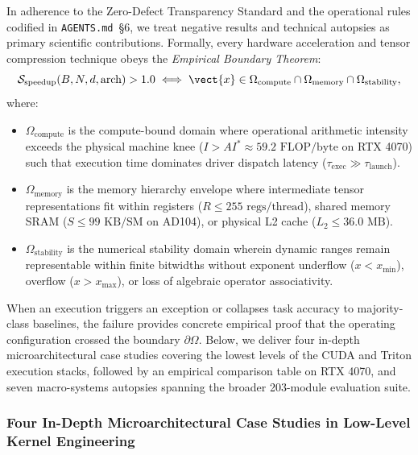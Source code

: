 In adherence to the \neuralops{} Zero-Defect Transparency Standard and the operational rules codified in \texttt{AGENTS.md}~\S6, we treat negative results and technical autopsies as primary scientific contributions. Formally, every hardware acceleration and tensor compression technique obeys the \emph{Empirical Boundary Theorem}:
\begin{equation}
    \mathcal{S}_{\text{speedup}}(B, N, d, \text{arch}) > 1.0 \iff \vect{x} \in \Omega_{\text{compute}} \cap \Omega_{\text{memory}} \cap \Omega_{\text{stability}},
    \label{eq:empirical_boundary_theorem}
\end{equation}
where:
\begin{itemize}
    \item $\Omega_{\text{compute}}$ is the compute-bound domain where operational arithmetic intensity exceeds the physical machine knee ($I > AI^* \approx 59.2\text{ FLOP/byte}$ on RTX 4070) such that execution time dominates driver dispatch latency ($\tau_{\text{exec}} \gg \tau_{\text{launch}}$).
    \item $\Omega_{\text{memory}}$ is the memory hierarchy envelope where intermediate tensor representations fit within registers ($R \le 255\text{ regs/thread}$), shared memory SRAM ($S \le 99\text{ KB/SM}$ on AD104), or physical L2 cache ($L_2 \le 36.0\text{ MB}$).
    \item $\Omega_{\text{stability}}$ is the numerical stability domain wherein dynamic ranges remain representable within finite bitwidths without exponent underflow ($x < x_{\min}$), overflow ($x > x_{\max}$), or loss of algebraic operator associativity.
\end{itemize}
When an execution triggers an exception or collapses task accuracy to majority-class baselines, the failure provides concrete empirical proof that the operating configuration crossed the boundary $\partial \Omega$. Below, we deliver four in-depth microarchitectural case studies covering the lowest levels of the CUDA and Triton execution stacks, followed by an empirical comparison table on RTX 4070, and seven macro-systems autopsies spanning the broader 203-module evaluation suite.

\subsubsection{Four In-Depth Microarchitectural Case Studies in Low-Level Kernel Engineering}
\label{sec:case_studies_kernel_forensics}

